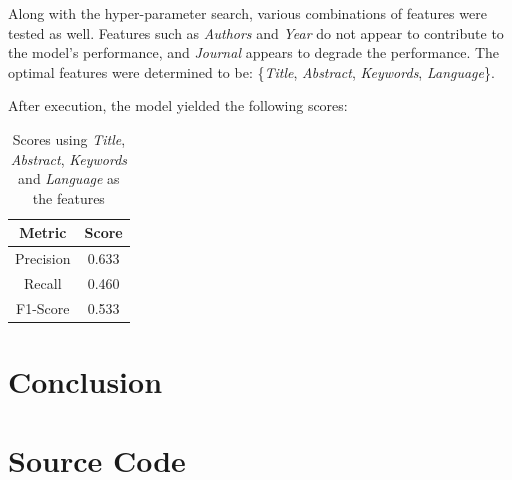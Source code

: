 \documentclass[11pt]{article}
\begin{document}
Along with the hyper-parameter search, various combinations of features were tested as well. Features such as \textit{Authors} and \textit{Year} do not appear to contribute to the model's performance, and \textit{Journal} appears to degrade the performance. The optimal features were determined to be: \{\textit{Title}, \textit{Abstract}, \textit{Keywords}, \textit{Language}\}.

After execution, the model yielded the following scores:
\begin{table}[!ht]
    \caption{Scores using \textit{Title}, \textit{Abstract}, \textit{Keywords} and \textit{Language} as the features}
    \begin{center}

        \begin{tabular}{| c | c |}
        \hline
        \textbf{Metric} & \textbf{Score}
        \\ \hline
        Precision & 0.633 
        \\ \hline
        Recall & 0.460
        \\ \hline
        F1-Score & 0.533
        \\ \hline
        \end{tabular}

    \end{center}

\end{table}

\section*{Conclusion}

\appendix
{}%

\section{Source Code} \label{appendix:src}


\end{document}
